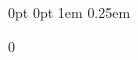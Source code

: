 

\DefineNewLength{\UWMad@Widest}         {0pt}        %
\DefineNewLength{\UWMad@WidestTest}     {0pt}        %
\DefineNewLength{\NomenTitleSkip}{0em}        %
\DefineNewLength{\NomenPrintSkip}{1em}        %
\DefineNewLength{\EntryMarginLeft}      {1em}
\DefineNewLength{\EntryMarginBottom}    {0.25em}

   {0}  %
\newcount\NomenNestLevel%
\newcount\NomenSectionLevel%

\newif\ifUWMad@MakeNomenclatureStarred\UWMad@MakeNomenclatureStarredtrue
\let\MakeNomenclatureStarred\UWMad@MakeNomenclatureStarredtrue
\let\MakeNomenclatureNotStarred\UWMad@MakeNomenclatureStarredfalse

\newcommand*{\UWMad@UpdateWidest}[1]{
    \settowidth{\UWMad@WidestTest}{#1}
    \ifdim\UWMad@Widest<\UWMad@WidestTest
        \setlength{\UWMad@Widest}{\UWMad@WidestTest}
    \fi
}
%
%
\newcommand{\TheNomenclatureName}{Nomenclature}
\newcommand{\NomenclatureName}[1]
    {\renewcommand{\TheNomenclatureName}{#1}}
%
\newcommand{\TheNomenGroupName}{}
\newcommand{\NomenGroupName}[1]
    {\renewcommand{\TheNomenGroupName}{#1}}
%
%
\newcommand{\NomenclatureNameStyle}
    {\ifdefempty{\TheNomenGroupName}%
        {}%
        {\ifUWMad@MakeNomenclatureStarred%
            \csname\TheCurrentSectioningCommand\endcsname*%
                {\TheNomenGroupName}%
            \UWMad@FrontMatterRegister%
                [\TheCurrentSectioningCommand]%
                {\TheNomenGroupName}
         \else%
            \csname\TheCurrentSectioningCommand\endcsname%
                {\TheNomenGroupName}%
         \fi}}
%
%
\newcommand{\TheCurrentSectioningCommand}{}
\newcommand{\CurrentSectioningCommand}[1]
    {\renewcommand{\TheCurrentSectioningCommand}{#1}}


